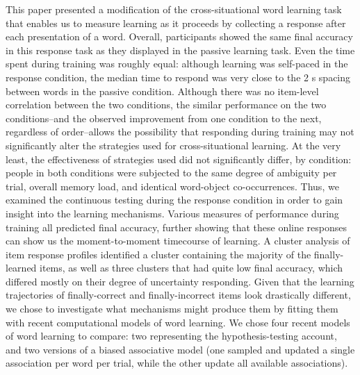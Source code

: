 \documentclass[man,floatsintext]{apa6}
\begin{document}
This paper presented a modification of the cross-situational word learning task that enables us to measure learning as it proceeds by collecting a response after each presentation of a word. Overall, participants showed the same final accuracy in this response task as they displayed in the passive learning task. Even the time spent during training was roughly equal: although learning was self-paced in the response condition, the median time to respond was very close to the 2 s spacing between words in the passive condition. Although there was no item-level correlation between the two conditions, the similar performance on the two conditions--and the observed improvement from one condition to the next, regardless of order--allows the possibility that responding during training may not significantly alter the strategies used for cross-situational learning. At the very least, the effectiveness of strategies used did not significantly differ, by condition: people in both conditions were subjected to the same degree of ambiguity per trial, overall memory load, and identical word-object co-occurrences. Thus, we examined the continuous testing during the response condition in order to gain insight into the learning mechanisms. Various measures of performance during training all predicted final accuracy, further showing that these online responses can show us the moment-to-moment timecourse of learning. A cluster analysis of item response profiles identified a cluster containing the majority of the finally-learned items, as well as three clusters that had quite low final accuracy, which differed mostly on their degree of uncertainty responding. Given that the learning trajectories of finally-correct and finally-incorrect items look drastically different, we chose to investigate what mechanisms might produce them by fitting them with recent computational models of word learning. We chose four recent models of word learning to compare: two representing the hypothesis-testing account, and two versions of a biased associative model (one sampled and updated a single association per word per trial, while the other update all available associations).
\end{document}
